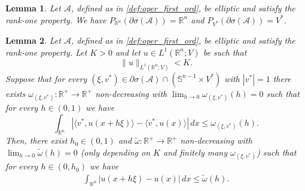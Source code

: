 \documentclass[10pt,a4paper]{amsart}
\newtheorem{lemma}{Lemma}
\newcommand{\A}{\mathcal{A}}
\newcommand{\R}{\mathbb{R}}
\newcommand{\s}{\mathbb{S}}
\begin{document}
\begin{lemma}\label{lem:directional_spectrum_surjectivity_projections}
    Let $\A$, defined as in \eqref{def:oper_first_ord}, be elliptic and satisfy the rank-one property. We have $P_{\R^n}(\partial \sigma(\A)) = \R^n$ and $P_{V^*}(\partial \sigma(\A)) = V^*$.
\end{lemma}

\begin{lemma}
\label{lem:translation_lemma}
    Let $\A$, defined as in \eqref{def:oper_first_ord}, be elliptic and satisfy the rank-one property. Let $K > 0$ and let $u \in L^1(\R^n; V)$ be such that 
    $$\| u \|_{L^1(\R^n; V)} < K.$$ 
    Suppose that for every $(\xi, v^*) \in \partial \sigma(\A) \cap (\s^{n-1} \times V^*)$ with $|v^*| = 1$ there exists $\omega_{(\xi, v^*)}: \R^+ \to \R^+$ non-decreasing with $\lim_{h \to 0} \omega_{(\xi, v^*)}(h) = 0$ such that for every $h \in (0,1)$ we have
    \[
        \int_{\R^n} |\langle v^*, u(x + h \xi)\rangle - \langle v^*, u(x) \rangle| \, dx \leq \omega_{(\xi, v^*)}(h).
    \]
    Then, there exist $h_0 \in (0,1)$ and $\tilde \omega : \R^+ \to \R^+$ non-decreasing with $\lim_{h \to 0} \tilde \omega(h) = 0$ (only depending on $K$ and finitely many $\omega_{(\xi, v^*)}$) such that for every $h \in (0, h_0)$ we have
    \begin{align}\label{eq:to_show}
        \int_{\R^n} |u(x + h \xi)- u(x)| \, dx \leq \tilde \omega(h).
    \end{align}
\end{lemma}
\end{document}

